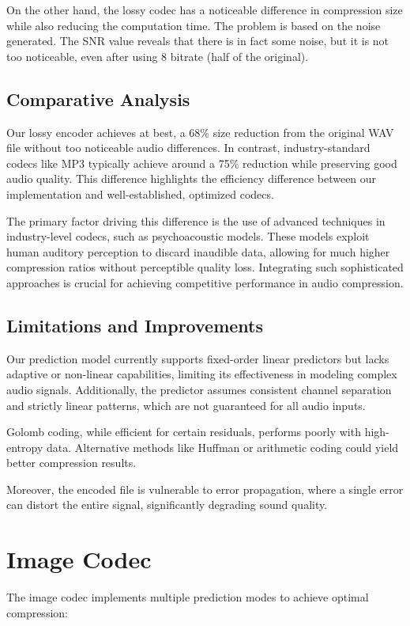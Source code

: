 \documentclass[a4paper,14pt]{article}
\begin{document}
On the other hand, the lossy codec has a noticeable difference in compression size while also reducing the computation time. The problem is based on the noise generated. The SNR value reveals that there is in fact some noise, but it is not too noticeable, even after using 8 bitrate (half of the original). 

\subsection{Comparative Analysis}
Our lossy encoder achieves at best, a 68\% size reduction from the original WAV file without too noticeable audio differences. In contrast, industry-standard codecs like MP3 typically achieve around a 75\% reduction while preserving good audio quality. This difference highlights the efficiency difference between our implementation and well-established, optimized codecs. 

The primary factor driving this difference is the use of advanced techniques in industry-level codecs, such as psychoacoustic models. These models exploit human auditory perception to discard inaudible data, allowing for much higher compression ratios without perceptible quality loss. Integrating such sophisticated approaches is crucial for achieving competitive performance in audio compression.



\subsection{Limitations and Improvements}
Our prediction model currently supports fixed-order linear predictors but lacks adaptive or non-linear capabilities, limiting its effectiveness in modeling complex audio signals. Additionally, the predictor assumes consistent channel separation and strictly linear patterns, which are not guaranteed for all audio inputs.

Golomb coding, while efficient for certain residuals, performs poorly with high-entropy data. Alternative methods like Huffman or arithmetic coding could yield better compression results.

Moreover, the encoded file is vulnerable to error propagation, where a single error can distort the entire signal, significantly degrading sound quality.


\section{Image Codec}
The image codec implements multiple prediction modes to achieve optimal compression:
\end{document}
